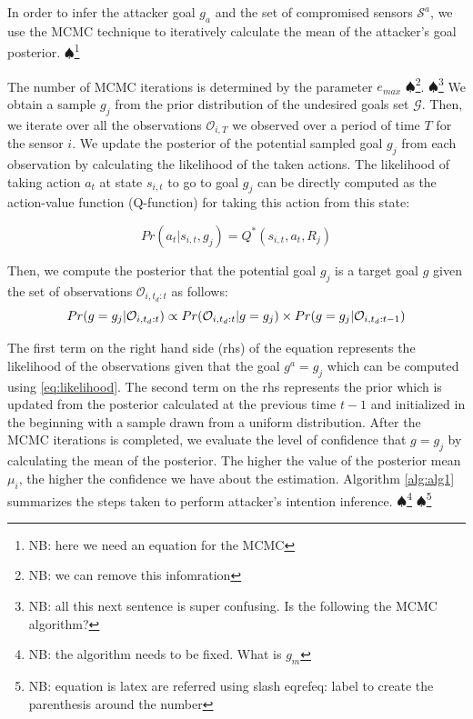 \documentclass[letterpaper, 10 pt, conference]{ieeeconf}  %
\newcommand\NB[1]{$\spadesuit$\footnote{NB: #1}}
\begin{document}
In order to infer the attacker goal $g_a$ and the set of compromised sensors $\mathcal{S}^a$, we use the MCMC technique to iteratively calculate the mean of the attacker's goal posterior. \NB{here we need an equation for the MCMC}

The number of MCMC iterations is determined by the parameter ${e}_{max}$ \NB{we can remove this infomration}. \NB{all this next sentence is super confusing. Is the following the MCMC algorithm? } We obtain a sample $g_j$ from the prior distribution of the undesired goals set $\mathcal{G}$. Then, we iterate over all the observations $\mathcal{O}_{i,T}$ we observed over a period of time $T$ for the sensor $i$. We update the posterior of the potential sampled goal $g_j$ from each observation by calculating the likelihood of the taken actions. The likelihood of taking action $a_t$ at state $s_{i,t}$ to go to goal $g_j$ can be directly computed as the action-value function (Q-function) for taking this action from this state:

\begin{equation} Pr(a_t|s_{i,t},g_j) = Q^*(s_{i,t},a_t,R_j)
\label{eqn:action_likelihood}
\end{equation}


Then, we compute the posterior that the potential goal $g_j$ is a target goal $g$ given the set of observations $\mathcal{O}_{i,t_d:t}$ as follows:
\begin{equation} Pr(g=g_j|\mathcal{O}_{i,t_d:t}) \propto Pr(\mathcal{O}_{i,t_d:t} | g = g_j) \\ \times Pr(g=g_j|\mathcal{O}_{i,t_d:t-1})
\label{eqn:goal_posterior}
\end{equation}

The first term on the right hand side (rhs) of the equation represents the likelihood of the observations given that the goal $g^a=g_j$ which can be computed using \eqref{eq:likelihood}. The second term on the rhs represents the prior which is updated from the posterior calculated at the previous time $t-1$ and initialized in the beginning with a sample drawn from a uniform distribution.
After the MCMC iterations is completed, we evaluate the level of confidence that $g = g_j$ by calculating the mean of the posterior. The higher the value of the posterior mean $\mu_i$, the higher the confidence we have about the estimation. Algorithm \ref{alg:alg1} summarizes the steps taken to perform attacker's intention inference. \NB{the algorithm needs to be fixed. What is $g_m$}
\NB{equation is latex are referred using slash eqref{eq: label} to create the parenthesis around the number }
\end{document}
